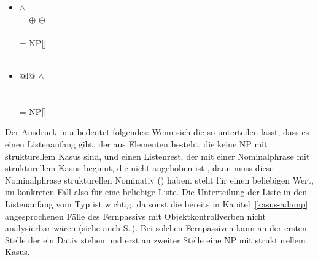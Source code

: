 {\medskip
\noindent
\begin{minipage}{\linewidth}
\begin{prinzip-break}[Kasusprinzip]
\label{Kasusprinzip}%
\begin{itemize}
\item[\textrm{a.}]
 $\wedge$\\
 =  $\oplus$  $\oplus$ \etag
\impl\\\\
\mbox{}\hspace{3cm}  = \textrm{NP[\snom]}\\\\
\end{itemize}
\end{prinzip-break}
\end{minipage}

%

\begin{itemize}
\item[\textrm{b.}]
\begin{tabular}[t]{@{}l@{}}
 $\wedge$\\
\\\\
\mbox{}\hspace{3cm}  = \textrm{NP[\sacc]}
\end{tabular}
\end{itemize}

\noindent
Der Ausdruck in a bedeutet folgendes: Wenn sich die \argstl so unterteilen lässt, dass es einen Listenanfang gibt, der aus Elementen besteht,
die keine NP mit strukturellem Kasus sind, und einen Listenrest, der mit einer Nominalphrase mit strukturellem
Kasus beginnt, die nicht angehoben ist , dann muss diese Nominalphrase strukturellen
Nominativ () haben. \etag steht für einen beliebigen Wert, im konkreten Fall also für eine beliebige Liste.
Die Unterteilung der Liste  in den Listenanfang vom Typ 
ist wichtig, da sonst die bereits in Kapitel~\ref{kasus-adamp} angesprochenen Fälle des Fernpassivs mit Objektkontrollverben
nicht analysierbar wären (siehe auch S.\,\pageref{page-remote-passive-erlauben}). Bei solchen
Fernpassiven kann an der ersten Stelle der \argstl ein Dativ stehen und erst an zweiter Stelle eine
NP mit strukturellem Kasus.

}
